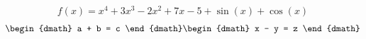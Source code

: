 \documentclass{article}
\begin{document}
\begin{dmath}
f(x) = x^4 + 3x^3 - 2x^2 + 7x - 5 + \sin(x) + \cos(x)
\end{dmath}
\begin{dgroup}
\begin{dmath}
a + b = c
\end{dmath}
\begin{dmath}
x - y = z
\end{dmath}
\end{dgroup}
\end{document}
